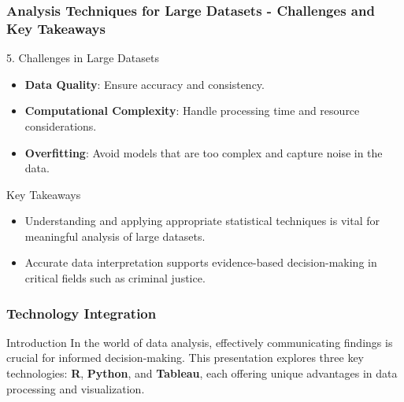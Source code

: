 \documentclass[aspectratio=169]{beamer}
\begin{document}
\begin{frame}[fragile]
    \frametitle{Analysis Techniques for Large Datasets - Challenges and Key Takeaways}
    \begin{block}{5. Challenges in Large Datasets}
        \begin{itemize}
            \item \textbf{Data Quality}: Ensure accuracy and consistency.
            \item \textbf{Computational Complexity}: Handle processing time and resource considerations.
            \item \textbf{Overfitting}: Avoid models that are too complex and capture noise in the data.
        \end{itemize}
    \end{block}
    \begin{block}{Key Takeaways}
        \begin{itemize}
            \item Understanding and applying appropriate statistical techniques is vital for meaningful analysis of large datasets.
            \item Accurate data interpretation supports evidence-based decision-making in critical fields such as criminal justice.
        \end{itemize}
    \end{block}
\end{frame}

\begin{frame}[fragile]
    \frametitle{Technology Integration}
    \begin{block}{Introduction}
        In the world of data analysis, effectively communicating findings is crucial for informed decision-making. This presentation explores three key technologies: \textbf{R}, \textbf{Python}, and \textbf{Tableau}, each offering unique advantages in data processing and visualization.
    \end{block}
\end{frame}
\end{document}
